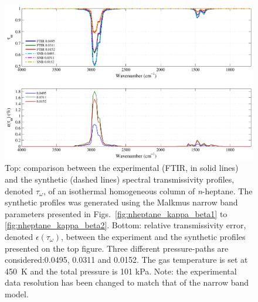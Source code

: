 \begin{figure}[p]
\includegraphics[width=\textwidth]{Figures/Comparison_Fit_Heptane_MALKMUS_Temp450K.pdf}
\caption{Top: comparison between the experimental (FTIR, in solid lines) and the synthetic (dashed lines) spectral transmissivity profiles, denoted $\tau_{\omega}$, of an isothermal homogeneous column of \textit{n}-heptane. The synthetic profiles was generated using the Malkmus narrow band parameters presented in Figs.~\ref{fig:nheptane_kappa_beta1} to \ref{fig:nheptane_kappa_beta2}. Bottom: relative transmissivity error, denoted $\epsilon{(\tau_{\omega})}$, between the experiment and the synthetic profiles presented on the top figure. Three different pressure-paths are considered:0.0495, 0.0311 and 0.0152. The gas temperature is set at 450~K and the total pressure is 101 kPa. Note: the experimental data resolution has been changed to match that of the narrow band model. \label{fig:nheptane_SNBVerify_450K}}
\end{figure}

